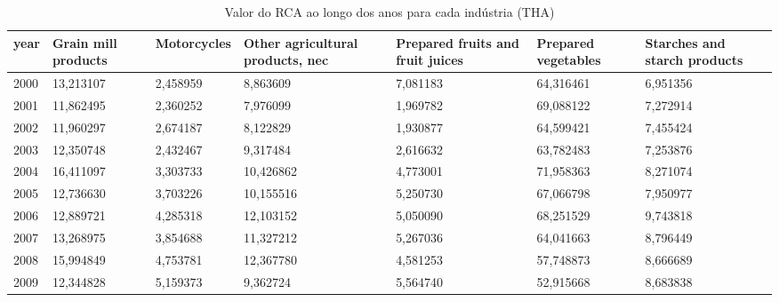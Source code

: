 \begin{table}
\centering
\caption{Valor do RCA ao longo dos anos para cada indústria (THA)}
\begin{tabular}{p{1cm}p{2cm}p{2cm}p{2cm}p{2cm}p{2cm}p{2cm}}
\toprule
 year &  Grain mill products &  Motorcycles &  Other agricultural products, nec &  Prepared fruits and fruit juices &  Prepared vegetables &  Starches and starch products \\
\midrule
 2000 &            13,213107 &     2,458959 &                          8,863609 &                          7,081183 &            64,316461 &                      6,951356 \\
 2001 &            11,862495 &     2,360252 &                          7,976099 &                          1,969782 &            69,088122 &                      7,272914 \\
 2002 &            11,960297 &     2,674187 &                          8,122829 &                          1,930877 &            64,599421 &                      7,455424 \\
 2003 &            12,350748 &     2,432467 &                          9,317484 &                          2,616632 &            63,782483 &                      7,253876 \\
 2004 &            16,411097 &     3,303733 &                         10,426862 &                          4,773001 &            71,958363 &                      8,271074 \\
 2005 &            12,736630 &     3,703226 &                         10,155516 &                          5,250730 &            67,066798 &                      7,950977 \\
 2006 &            12,889721 &     4,285318 &                         12,103152 &                          5,050090 &            68,251529 &                      9,743818 \\
 2007 &            13,268975 &     3,854688 &                         11,327212 &                          5,267036 &            64,041663 &                      8,796449 \\
 2008 &            15,994849 &     4,753781 &                         12,367780 &                          4,581253 &            57,748873 &                      8,666689 \\
 2009 &            12,344828 &     5,159373 &                          9,362724 &                          5,564740 &            52,915668 &                      8,683838 \\

\end{tabular}
\end{table}

